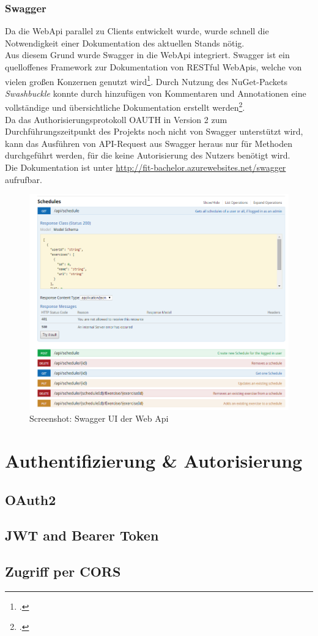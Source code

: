 \subsubsection*{Swagger}
\label{sssec:Swagger}
Da die WebApi parallel zu Clients entwickelt wurde, wurde schnell die Notwendigkeit einer Dokumentation des aktuellen Stands nötig. \\
Aus diesem Grund wurde Swagger in die WebApi integriert. Swagger ist ein quelloffenes Framework zur Dokumentation von RESTful WebApis, welche von vielen großen Konzernen genutzt wird\footcite{swagger}. Durch Nutzung des \ac{NuGet}-Packets \textit{Swashbuckle} konnte durch hinzufügen von Kommentaren und Annotationen eine vollständige und übersichtliche Dokumentation erstellt werden\footcite{implementing-Swagger}. \\
Da das Authorisierungsprotokoll OAUTH in Version 2 zum Durchführungszeitpunkt des Projekts noch nicht von Swagger unterstützt wird, kann das Ausführen von API-Request aus Swagger heraus nur für Methoden durchgeführt werden, für die keine Autorisierung des Nutzers benötigt wird. \\
Die Dokumentation ist unter \href{http://fit-bachelor.azurewebsites.net/swagger}{http://fit-bachelor.azurewebsites.net/swagger} aufrufbar. 
\begin{figure}[h]
\centering
\includegraphics[width=0.8\linewidth]{content/images/Swagger-UI-fIT}
\caption{Screenshot: Swagger UI der Web Api}
\label{pic:swagger-UI}
\end{figure}
\section{Authentifizierung \& Autorisierung}
\label{sec:server-authorisierung}

\subsection{OAuth2}
\label{ssec:oauth2}

\subsection{JWT and Bearer Token}
\label{ssec:jwt-bearer}

\subsection{Zugriff per CORS}
\label{ssec:cors}